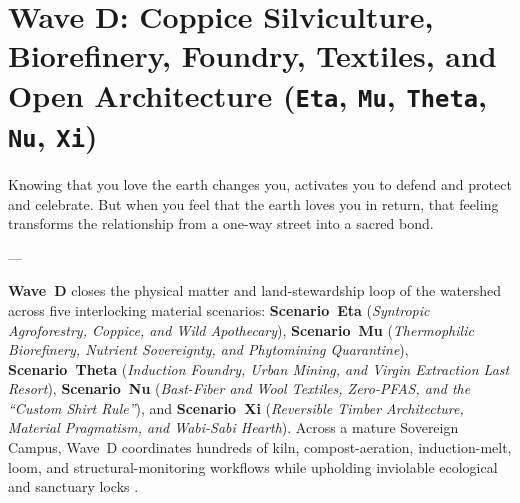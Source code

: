 \chapter{Wave D: Coppice Silviculture, Biorefinery, Foundry, Textiles, and Open Architecture (\texttt{Eta}, \texttt{Mu}, \texttt{Theta}, \texttt{Nu}, \texttt{Xi})}
\label{ch:l5-wave-d}

\epigraph{Knowing that you love the earth changes you, activates you to defend and protect and celebrate. But when you feel that the earth loves you in return, that feeling transforms the relationship from a one-way street into a sacred bond.}{---\textcite{kimmerer2013}}

\textbf{Wave~D} closes the physical matter and land-stewardship loop of the watershed across five
interlocking material scenarios: \textbf{Scenario~Eta} (\textit{Syntropic Agroforestry, Coppice,
and Wild Apothecary}), \textbf{Scenario~Mu} (\textit{Thermophilic Biorefinery, Nutrient Sovereignty,
and Phytomining Quarantine}), \textbf{Scenario~Theta} (\textit{Induction Foundry, Urban Mining, and
Virgin Extraction Last Resort}), \textbf{Scenario~Nu} (\textit{Bast-Fiber and Wool Textiles,
Zero-PFAS, and the ``Custom Shirt Rule''}), and \textbf{Scenario~Xi} (\textit{Reversible Timber
Architecture, Material Pragmatism, and Wabi-Sabi Hearth}). Across a mature Sovereign Campus, Wave~D
coordinates hundreds of kiln, compost-aeration, induction-melt, loom, and structural-monitoring
workflows while upholding inviolable ecological and sanctuary locks \parencite{rockstrom2009safe,georgescu1971,habraken1972supports}.

